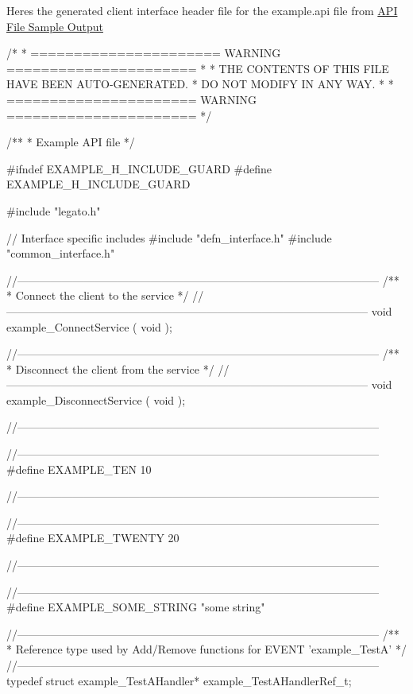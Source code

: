 Here\textquotesingle{}s the generated client interface header file for the example.\+api file from \hyperlink{interface_def_lang_c_interfaceDefLangC_sampleAPI}{A\+P\+I File Sample Output}


\begin{DoxyVerbInclude}
/*
 * ====================== WARNING ======================
 *
 * THE CONTENTS OF THIS FILE HAVE BEEN AUTO-GENERATED.
 * DO NOT MODIFY IN ANY WAY.
 *
 * ====================== WARNING ======================
 */

/**
 * Example API file
 */

#ifndef EXAMPLE_H_INCLUDE_GUARD
#define EXAMPLE_H_INCLUDE_GUARD


#include "legato.h"

// Interface specific includes
#include "defn_interface.h"
#include "common_interface.h"


//--------------------------------------------------------------------------------------------------
/**
 * Connect the client to the service
 */
//--------------------------------------------------------------------------------------------------
void example_ConnectService
(
    void
);

//--------------------------------------------------------------------------------------------------
/**
 * Disconnect the client from the service
 */
//--------------------------------------------------------------------------------------------------
void example_DisconnectService
(
    void
);


//--------------------------------------------------------------------------------------------------

//--------------------------------------------------------------------------------------------------
#define EXAMPLE_TEN 10


//--------------------------------------------------------------------------------------------------

//--------------------------------------------------------------------------------------------------
#define EXAMPLE_TWENTY 20


//--------------------------------------------------------------------------------------------------

//--------------------------------------------------------------------------------------------------
#define EXAMPLE_SOME_STRING "some string"


//--------------------------------------------------------------------------------------------------
/**
 * Reference type used by Add/Remove functions for EVENT 'example_TestA'
 */
//--------------------------------------------------------------------------------------------------
typedef struct example_TestAHandler* example_TestAHandlerRef_t;



\end{DoxyVerbInclude}
